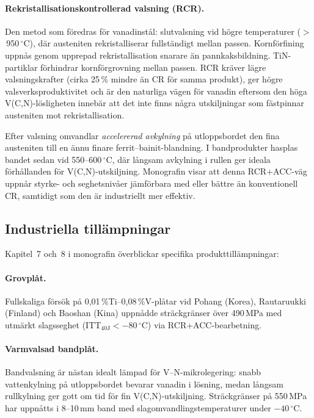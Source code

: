 \documentclass[11pt,a4paper]{article}
\begin{document}
\paragraph{Rekristallisationskontrollerad valsning (RCR).} Den metod
som f\"oredras f\"or vanadinst\aa{}l: slutvalsning vid h\"ogre
temperaturer ($>$\,950\,${}^\circ$C), d\"ar austeniten rekristalliserar
fullst\"andigt mellan passen.  Kornf\"orfining uppn\aa{}s genom upprepad
rekristallisation snarare \"an pannkaksbildning.  TiN-partiklar
f\"orhindrar kornf\"orgrovning mellan passen.  RCR kr\"aver l\"agre
valsningskrafter (cirka 25\,\% mindre \"an CR f\"or samma produkt), ger
h\"ogre valsverksproduktivitet och \"ar den naturliga v\"agen f\"or
vanadin eftersom den h\"oga V(C,N)-l\"osligheten inneb\"ar att det inte
finns n\aa{}gra utskiljningar som f\"astpinnar austeniten mot
rekristallisation.

Efter valsning omvandlar \emph{accelererad avkylning} p\aa{}
utloppsbordet den fina austeniten till en \"annu finare
ferrit--bainit-blandning.  I bandprodukter hasplas bandet sedan vid
550--600\,${}^\circ$C, d\"ar l\aa{}ngsam avkylning i rullen ger ideala
f\"orh\aa{}llanden f\"or V(C,N)-utskiljning.  Monografin visar att
denna RCR+ACC-v\"ag uppn\aa{}r styrke- och seghetsniv\aa{}er j\"amf\"orbara
med eller b\"attre \"an konventionell CR, samtidigt som den \"ar
industriellt mer effektiv.

\subsection{Industriella till\"ampningar}

Kapitel~7 och~8 i monografin \"overblickar specifika
produkttill\"ampningar:

\paragraph{Grovpl\aa{}t.}  Fullskaliga f\"ors\"ok p\aa{}
0,01\,\%Ti--0,08\,\%V-pl\aa{}tar vid Pohang (Korea), Rautaruukki
(Finland) och Baoshan (Kina) uppn\aa{}dde str\"ackgr\"anser \"over
490\,MPa med utm\"arkt slagsseghet
(ITT$_{40\text{J}} < -80\,{}^\circ$C) via RCR+ACC-bearbetning.

\paragraph{Varmvalsad bandpl\aa{}t.}  Bandvalsning \"ar n\"astan idealt
l\"ampad f\"or V--N-mikrolegering: snabb vattenkylning p\aa{}
utloppsbordet bevarar vanadin i l\"osning, medan l\aa{}ngsam
rullkylning ger gott om tid f\"or fin V(C,N)-utskiljning.
Str\"ackgr\"anser p\aa{} 550\,MPa har uppn\aa{}tts i 8--10\,mm band med
slagomvandlingstemperaturer under $-40\,{}^\circ$C.
\end{document}

